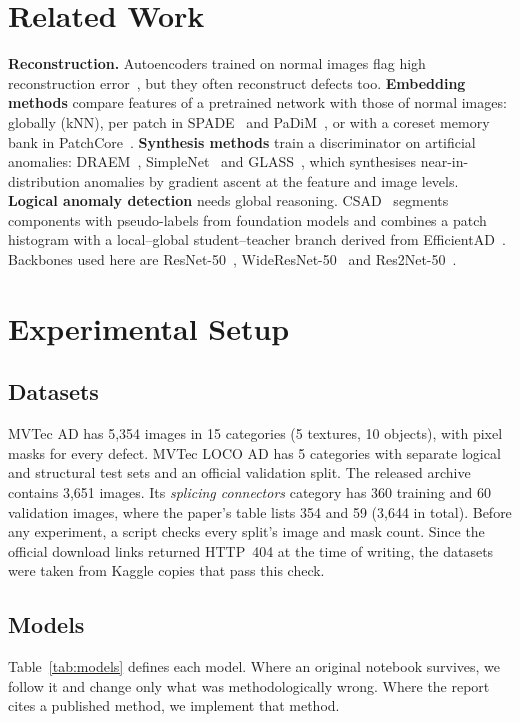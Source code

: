 \documentclass[conference]{IEEEtran}
\begin{document}
\section{Related Work}

\textbf{Reconstruction.} Autoencoders trained on normal images flag high reconstruction
error~\cite{bergmann2019ssim}, but they often reconstruct defects too. \textbf{Embedding methods} compare features
of a pretrained network with those of normal images: globally (kNN), per patch in SPADE~\cite{cohen2020spade} and
PaDiM~\cite{defard2021padim}, or with a coreset memory bank in PatchCore~\cite{roth2022patchcore}.
\textbf{Synthesis methods} train a discriminator on artificial anomalies: DRAEM~\cite{zavrtanik2021draem},
SimpleNet~\cite{liu2023simplenet} and GLASS~\cite{chen2024glass}, which synthesises near-in-distribution anomalies
by gradient ascent at the feature and image levels. \textbf{Logical anomaly detection} needs global reasoning.
CSAD~\cite{hsieh2024csad} segments components with pseudo-labels from foundation models and combines a patch
histogram with a local--global student--teacher branch derived from EfficientAD~\cite{batzner2024efficientad}.
Backbones used here are ResNet-50~\cite{he2016resnet}, WideResNet-50~\cite{zagoruyko2016wide} and
Res2Net-50~\cite{gao2021res2net}.

\section{Experimental Setup}\label{sec:setup}

\subsection{Datasets}
MVTec AD has 5,354 images in 15 categories (5 textures, 10 objects), with pixel masks for every defect. MVTec LOCO AD
has 5 categories with separate logical and structural test sets and an official validation split. The released
archive contains 3,651 images. Its \emph{splicing connectors} category has 360 training and 60 validation images,
where the paper's table lists 354 and 59 (3,644 in total). Before any experiment, a script checks every split's
image and mask count. Since the official download links returned HTTP~404 at the time of writing, the datasets
were taken from Kaggle copies that pass this check.

\subsection{Models}
Table~\ref{tab:models} defines each model. Where an original notebook survives, we follow it and change only what
was methodologically wrong. Where the report cites a published method, we implement that method.
\end{document}
